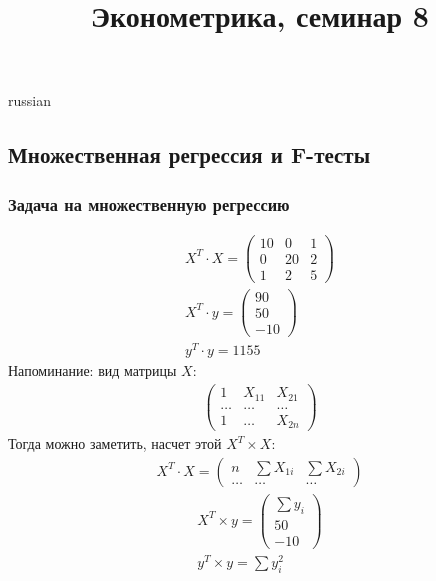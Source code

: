 \documentclass{article}
\begin{document}
\title{\foreignlanguage{russian}{Эконометрика, семинар 8}}
\maketitle
\begin{otherlanguage*}{russian}
\subsection*{Множественная регрессия и F-тесты}
\subsubsection*{Задача на множественную регрессию}
\begin{align*}
X^T \cdot X = \begin{pmatrix}
10 & 0 & 1 \\ 
0 & 20 & 2 \\
1 & 2 & 5
\end{pmatrix} \\
X^T \cdot y = \begin{pmatrix}
90 \\ 50 \\ -10 
\end{pmatrix} \\
y^T \cdot y = 1155 
\end{align*}
Напоминание: вид матрицы $ X $:
\begin{align*}
\begin{pmatrix}
1 & X_{11} & X_{21} \\
\ldots & \ldots & \ldots \\ 
1 & \ldots & X_{2n}
\end{pmatrix}
\end{align*} 
Тогда можно заметить, насчет этой $ X^T \times X $:
\begin{align*}
X^T \cdot X = \begin{pmatrix}
n & \sum X_{1i} & \sum X_{2i} \\
\ldots & \ldots & \ldots 
\end{pmatrix}
\end{align*}
\begin{align*}
X^T \times y = \begin{pmatrix}
\sum y_i \\
50 \\
-10 
\end{pmatrix} \\
y^T \times y = \sum y_i ^ 2 
\end{align*}
\begin{align*}

\end{align*}
\end{otherlanguage*}
\end{document}
